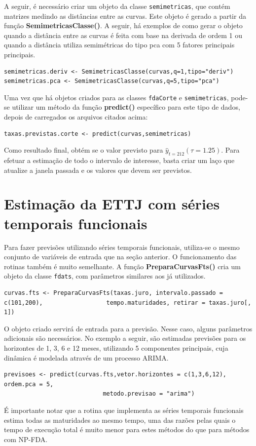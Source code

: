 \documentclass[
	12pt,				%
	openright,			%
	oneside,			%
	a4paper,			%
	english,			%
	brazil				%
	]{dissertacao-ufrgs-abntex2}
\begin{document}
\begin{apendicesenv}
A seguir, é necessário criar um objeto da classe \texttt{semimetricas}, que contém matrizes medindo as distâncias entre as curvas. Este objeto é gerado a partir da função \textbf{SemimetricasClasse()}. A seguir, há exemplos de como gerar o objeto quando a distância entre as curvas é feita com base na derivada de ordem 1 ou quando a distância utiliza semimétricas do tipo pca com 5 fatores principais principais.
\begin{lstlisting} 
semimetricas.deriv <- SemimetricasClasse(curvas,q=1,tipo="deriv")
semimetricas.pca <- SemimetricasClasse(curvas,q=5,tipo="pca")
\end{lstlisting}
Uma vez que há objetos criados para as classes \texttt{fdaCorte} e \texttt{semimetricas}, pode-se utilizar um método da função \textbf{predict()} específico para este tipo de dados, depois de carregados os arquivos citados acima:
\begin{lstlisting}
taxas.previstas.corte <- predict(curvas,semimetricas)
\end{lstlisting}
Como resultado final, obtém se o valor previsto para $\hat{y}_{t=212}(\tau = 1.25)$. Para efetuar a estimação de todo o intervalo de interesse, basta criar um laço que atualize a janela passada e os valores que devem ser previstos.

\section{Estimação da ETTJ com séries temporais funcionais}

Para fazer previsões utilizando séries temporais funcionais, utiliza-se o mesmo conjunto de variáveis de entrada que na seção anterior. O funcionamento das rotinas também é muito semelhante. A função \textbf{PreparaCurvasFts()} cria um objeto da classe \texttt{fdats}, com parâmetros similares aos já utilizados.
\begin{lstlisting} 
curvas.fts <- PreparaCurvasFts(taxas.juro, intervalo.passado = c(101,200), 					tempo.maturidades, retirar = taxas.juro[, 1])
\end{lstlisting} 
O objeto criado servirá de entrada para a previsão. Nesse caso, alguns parâmetros adicionais são necessários. No exemplo a seguir, são estimadas previsões para os horizontes de 1, 3, 6 e 12 meses, utilizando 5 componentes principais, cuja dinâmica é modelada através de um processo ARIMA. 
\begin{lstlisting} 
previsoes <- predict(curvas.fts,vetor.horizontes = c(1,3,6,12), ordem.pca = 5, 
							metodo.previsao = "arima")
\end{lstlisting}
É importante notar que a rotina que implementa as séries temporais funcionais estima todas as maturidades ao mesmo tempo, uma das razões pelas quais o tempo de execução total é muito menor para estes métodos do que para métodos com NP-FDA.


\end{apendicesenv}
\end{document}
